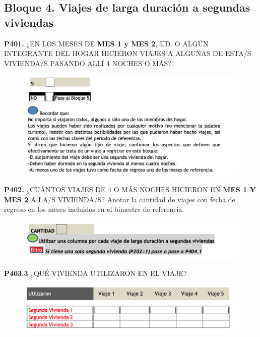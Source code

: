 \documentclass[
  openany]{book}
\begin{document}
\hypertarget{bloque-4.-viajes-de-larga-duraciuxf3n-a-segundas-viviendas}{%
\subsection{Bloque 4. Viajes de larga duración a segundas viviendas}\label{bloque-4.-viajes-de-larga-duraciuxf3n-a-segundas-viviendas}}

\textbf{P401.} ¿EN LOS MESES DE \textbf{MES 1 y MES 2}, UD. O ALGÚN INTEGRANTE DEL HOGAR HICIERON VIAJES A ALGUNAS DE ESTA/S VIVIENDA/S PASANDO ALLÍ 4 NOCHES O MÁS?

\begin{figure}

{\centering \includegraphics[width=1\linewidth]{imagenes/figura6-174} 

}

\end{figure}

\textbf{P402.} ¿CUÁNTOS VIAJES DE 4 O MÁS NOCHES HICIERON EN \textbf{MES 1 Y MES 2} A LA/S VIVIENDA/S?
Anotar la cantidad de viajes con fecha de regreso en los meses incluidos en el bimestre de referencia.

\begin{figure}

{\centering \includegraphics[width=1\linewidth]{imagenes/figura6-175} 

}

\end{figure}

\textbf{P403.3} ¿QUÉ VIVIENDA UTILIZARON EN EL VIAJE?

\begin{figure}

{\centering \includegraphics[width=1\linewidth]{imagenes/figura6-176} 

}

\end{figure}
\end{document}
